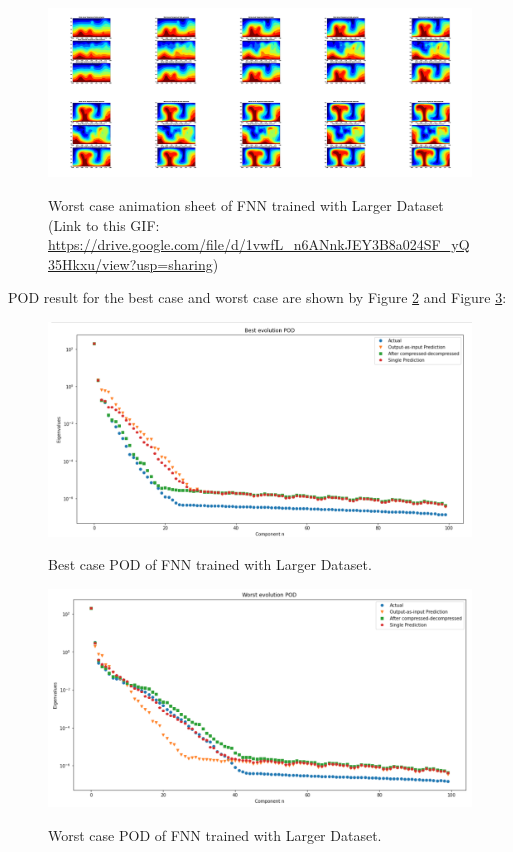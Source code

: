 \begin{figure}[H]
    \centering
    \caption{Worst case animation sheet of FNN trained with Larger Dataset (Link to this GIF: 
    \url{https://drive.google.com/file/d/1vwfL_n6ANnkJEY3B8a024SF_yQ35Hkxu/view?usp=sharing})}
    \includegraphics[scale=0.10]{figures/mantle_convection_images/larger_dataset/FNN_Worst_GIF_sheet.png}
    \label{figure:FNN_larger_worst_gif}
\end{figure}

POD result for the best case and worst case are shown by Figure \ref{figure:FNN_larger_best_POD} and Figure \ref{figure:FNN_larger_worst_POD}:

\begin{figure}[H]
    \caption{Best case POD of FNN trained with Larger Dataset.}
    \includegraphics[scale=0.5]{figures/mantle_convection_images/larger_dataset/FNN_Best_POD.png}
    \label{figure:FNN_larger_best_POD}
\end{figure}

\begin{figure}[H]
    \caption{Worst case POD of FNN trained with Larger Dataset.}
    \includegraphics[scale=0.5]{figures/mantle_convection_images/larger_dataset/FNN_Worst_POD.png}
    \label{figure:FNN_larger_worst_POD}
\end{figure}

